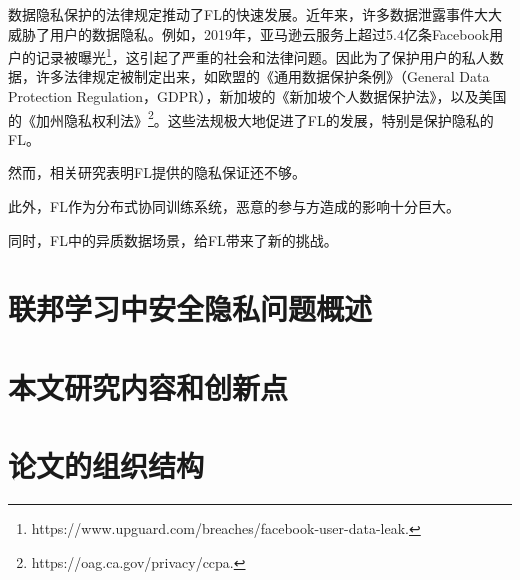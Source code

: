 数据隐私保护的法律规定推动了FL的快速发展。近年来，许多数据泄露事件大大威胁了用户的数据隐私。例如，2019年，亚马逊云服务上超过5.4亿条Facebook用户的记录被曝光\footnote{https://www.upguard.com/breaches/facebook-user-data-leak.}，这引起了严重的社会和法律问题。因此为了保护用户的私人数据，许多法律规定被制定出来，如欧盟的《通用数据保护条例》（General Data Protection Regulation，GDPR）\cite{voigt2017eu}，新加坡的《新加坡个人数据保护法》\cite{chik2013singapore}，以及美国的《加州隐私权利法》\footnote{https://oag.ca.gov/privacy/ccpa.}。这些法规极大地促进了FL的发展，特别是保护隐私的FL。

然而，相关研究表明FL提供的隐私保证还不够。

此外，FL作为分布式协同训练系统，恶意的参与方造成的影响十分巨大。

同时，FL中的异质数据场景，给FL带来了新的挑战。

\section{联邦学习中安全隐私问题概述}


\section{本文研究内容和创新点}


\section{论文的组织结构}
